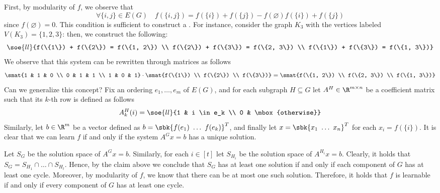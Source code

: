 \documentclass[a4paper, 12pt]{report}
\begin{document}
{\begin{enumerate}
                First, by modularity of $f$, we observe that $$\forall \{i, j\} \in E(G) \quad f(\{i,j \}) = f(\{i\}) + f(\{j\}) - f(\varnothing)  f(\{i\}) + f(\{j\})$$ since $f(\varnothing) = 0$. This condition is sufficient to construct a . For instance, consider the graph $K_3$ with the vertices labeled $V(K_3) = \{1, 2, 3\}$: then, we construct the following: $$\soe{ll}{f(\{1\}) + f(\{2\}) = f(\{1, 2\}) \\ f(\{2\}) + f(\{3\}) = f(\{2, 3\}) \\ f(\{1\}) + f(\{3\}) = f(\{1, 3\})}$$ We observe that this system can be rewritten through matrices as follows $$\smat{1 & 1 & 0 \\ 0 & 1 & 1 \\ 1 & 0 & 1} \cdot \smat{f(\{1\}) \\ f(\{2\})  \\ f(\{3\})} = \smat{f(\{1, 2\}) \\ f(\{2, 3\}) \\ f(\{1, 3\})}$$ Can we generalize this concept? Fix an ordering $e_1, \ldots, e_m$ of $E(G)$, and for each subgraph $H \subseteq G$ let $A^H \in \R^{m \times n}$ be a coefficient matrix such that its $k$-th row is defined as follows $$A^H_k(i) = \soe{ll}{1 & i \in e_k \\ 0 & \mbox{otherwise}}$$ Similarly, let $b \in \R^m$ be a vector defined as $b = \sbk{f(e_1) \ \ldots \ f(e_k)}^T$, and finally let $x = \sbk{x_1 \ \ldots \ x_n}^T$ for each $x_i = f(\{i\})$. It is clear that we can learn $f$ if and only if the system $A^Gx = b$ has a unique solution.


                Let $S_G$ be the solution space of $A^Gx = b$. Similarly, for each $i \in [t]$ let $S_{H_i}$ be the solution space of $A^{H_i} x = b$. Clearly, it holds that $S_G = S_{H_1} \cap \ldots \cap S_{H_t}$. Hence, by the claim above we conclude that $S_G$ has at least one solution if and only if each component of $G$ has at least one cycle. Moreover, by modularity of $f$, we know that there can be at most one such solution. Therefore, it holds that $f$ is learnable if and only if every component of $G$ has at least one cycle.


\end{enumerate}}
\end{document}
